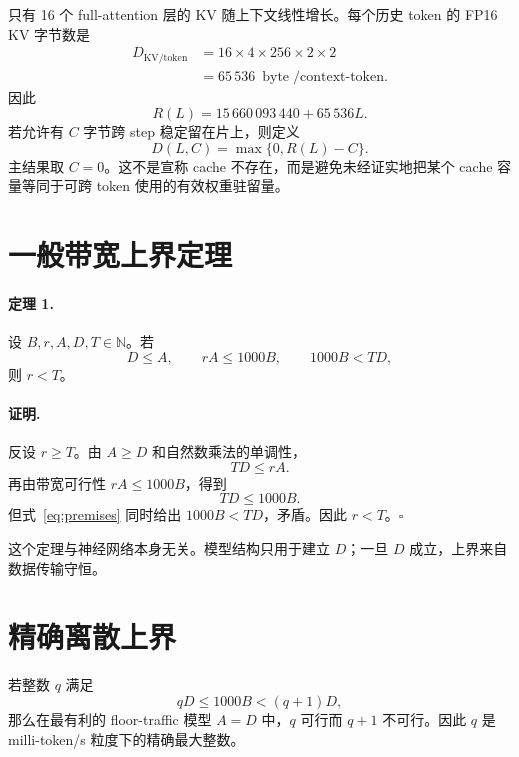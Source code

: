 \documentclass[11pt,a4paper]{ctexart}
\newcommand{\bytes}{\operatorname{byte}}
\begin{document}
只有 16 个 full-attention 层的 KV 随上下文线性增长。每个历史 token 的 FP16 KV 字节数是
\begin{equation}
\begin{aligned}
D_{\mathrm{KV/token}}
&=16\times4\times256\times2\times2\\
&=65\,536\ \bytes/\text{context-token}.
\end{aligned}
\label{eq:kv}
\end{equation}
因此
\begin{equation}
  R(L)=15\,660\,093\,440+65\,536L.
  \label{eq:R}
\end{equation}
若允许有 $C$ 字节跨 step 稳定留在片上，则定义
\begin{equation}
  D(L,C)=\max\{0,R(L)-C\}.
  \label{eq:D}
\end{equation}
主结果取 $C=0$。这不是宣称 cache 不存在，而是避免未经证实地把某个 cache 容量等同于可跨 token 使用的有效权重驻留量。

\section{一般带宽上界定理}

\paragraph{定理 1.}
设 $B,r,A,D,T\in\mathbb N$。若
\begin{equation}
 D\le A,\qquad rA\le1000B,
 \qquad 1000B<TD,
 \label{eq:premises}
\end{equation}
则 $r<T$。

\paragraph{证明.}
反设 $r\ge T$。由 $A\ge D$ 和自然数乘法的单调性，
\[
  TD\le rA.
\]
再由带宽可行性 $rA\le1000B$，得到
\[
  TD\le1000B.
\]
但式~\eqref{eq:premises} 同时给出 $1000B<TD$，矛盾。因此 $r<T$。\hfill$\square$

这个定理与神经网络本身无关。模型结构只用于建立 $D$；一旦 $D$ 成立，上界来自数据传输守恒。

\section{精确离散上界}

若整数 $q$ 满足
\begin{equation}
  qD\le1000B<(q+1)D,
  \label{eq:exact}
\end{equation}
那么在最有利的 floor-traffic 模型 $A=D$ 中，$q$ 可行而 $q+1$ 不可行。因此 $q$ 是 milli-token/s 粒度下的精确最大整数。
\end{document}
